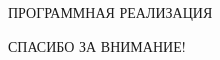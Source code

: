 \documentclass[serif,10pt,utf8, russian]{beamer}
\begin{document}
\begin{frame}
\begin{center}
\par{\large ПРОГРАММНАЯ РЕАЛИЗАЦИЯ}
\end{center}
\end{frame}

\begin{frame}
\begin{center}
\par{\large СПАСИБО ЗА ВНИМАНИЕ!}
\end{center}
\end{frame}
\end{document}
